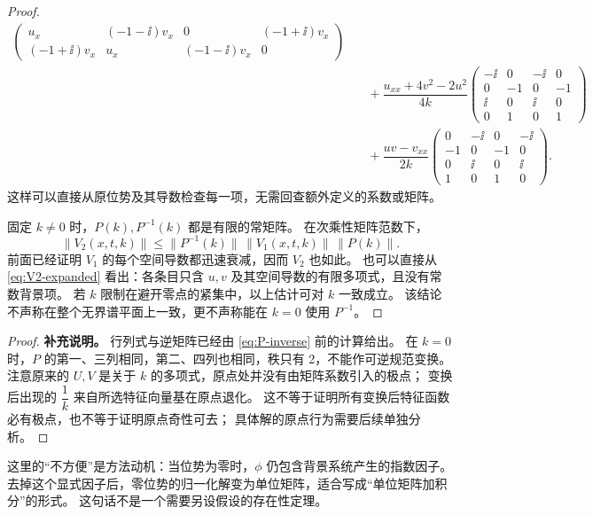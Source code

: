 \begin{proof}
\begin{equation}
\begin{aligned}
\begin{pmatrix}
u_x&(-1-\ii)v_x&0&(-1+\ii)v_x\\
(-1+\ii)v_x&u_x&(-1-\ii)v_x&0
\end{pmatrix}\\
&\quad+\dfrac{u_{xx}+4v^2-2u^2}{4k}
\begin{pmatrix}
-\ii&0&-\ii&0\\0&-1&0&-1\\
\ii&0&\ii&0\\0&1&0&1
\end{pmatrix}\\
&\quad+\dfrac{uv-v_{xx}}{2k}
\begin{pmatrix}
0&-\ii&0&-\ii\\-1&0&-1&0\\
0&\ii&0&\ii\\1&0&1&0
\end{pmatrix}.
\end{aligned}
\end{equation}
这样可以直接从原位势及其导数检查每一项，无需回查额外定义的系数或矩阵。

固定 $k\ne0$ 时，$P(k),P^{-1}(k)$ 都是有限的常矩阵。
在次乘性矩阵范数下，
\[
\|V_2(x,t,k)\|\le
\|P^{-1}(k)\|\,\|V_1(x,t,k)\|\,\|P(k)\|.
\]
前面已经证明 $V_1$ 的每个空间导数都迅速衰减，因而 $V_2$ 也如此。
也可以直接从 \eqref{eq:V2-expanded} 看出：各条目只含 $u,v$ 及其空间导数的有限多项式，且没有常数背景项。
若 $k$ 限制在避开零点的紧集中，以上估计可对 $k$ 一致成立。
该结论不声称在整个无界谱平面上一致，更不声称能在 $k=0$ 使用 $P^{-1}$。
\end{proof}

\begin{proof}
\textbf{补充说明。}
行列式与逆矩阵已经由 \eqref{eq:P-inverse} 前的计算给出。
在 $k=0$ 时，$P$ 的第一、三列相同，第二、四列也相同，秩只有 2，不能作可逆规范变换。
注意原来的 $U,V$ 是关于 $k$ 的多项式，原点处并没有由矩阵系数引入的极点；
变换后出现的 $\dfrac{1}{k}$ 来自所选特征向量基在原点退化。
这不等于证明所有变换后特征函数必有极点，也不等于证明原点奇性可去；
具体解的原点行为需要后续单独分析。
\end{proof}

\begin{note}
这里的“不方便”是方法动机：当位势为零时，$\phi$ 仍包含背景系统产生的指数因子。
去掉这个显式因子后，零位势的归一化解变为单位矩阵，适合写成“单位矩阵加积分”的形式。
这句话不是一个需要另设假设的存在性定理。
\end{note}

